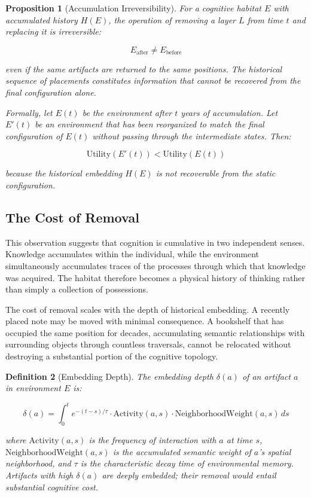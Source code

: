 \documentclass[12pt,oneside]{article}
\newtheorem{definition}{Definition}[section]
\newtheorem{proposition}[definition]{Proposition}
\theoremstyle{remark}
\begin{document}
\begin{proposition}[Accumulation Irreversibility]
For a cognitive habitat $E$ with accumulated history $H(E)$, the operation of removing a layer $L$ from time $t$ and replacing it is irreversible:

\begin{equation}
E_{\text{after}} \neq E_{\text{before}}
\end{equation}

even if the same artifacts are returned to the same positions. The historical sequence of placements constitutes information that cannot be recovered from the final configuration alone.

Formally, let $E(t)$ be the environment after $t$ years of accumulation. Let $E'(t)$ be an environment that has been reorganized to match the final configuration of $E(t)$ without passing through the intermediate states. Then:

\begin{equation}
\text{Utility}(E'(t)) < \text{Utility}(E(t))
\end{equation}

because the historical embedding $H(E)$ is not recoverable from the static configuration.
\end{proposition}

\subsection{The Cost of Removal}

This observation suggests that cognition is cumulative in two independent senses. Knowledge accumulates within the individual, while the environment simultaneously accumulates traces of the processes through which that knowledge was acquired. The habitat therefore becomes a physical history of thinking rather than simply a collection of possessions.

The cost of removal scales with the depth of historical embedding. A recently placed note may be moved with minimal consequence. A bookshelf that has occupied the same position for decades, accumulating semantic relationships with surrounding objects through countless traversals, cannot be relocated without destroying a substantial portion of the cognitive topology.

\begin{definition}[Embedding Depth]
The embedding depth $\delta(a)$ of an artifact $a$ in environment $E$ is:

\begin{equation}
\delta(a) = \int_{0}^{t} e^{-(t-s)/\tau} \cdot \text{Activity}(a, s) \cdot \text{NeighborhoodWeight}(a, s) \, ds
\end{equation}

where $\text{Activity}(a, s)$ is the frequency of interaction with $a$ at time $s$, $\text{NeighborhoodWeight}(a, s)$ is the accumulated semantic weight of $a$'s spatial neighborhood, and $\tau$ is the characteristic decay time of environmental memory. Artifacts with high $\delta(a)$ are deeply embedded; their removal would entail substantial cognitive cost.
\end{definition}
\end{document}
